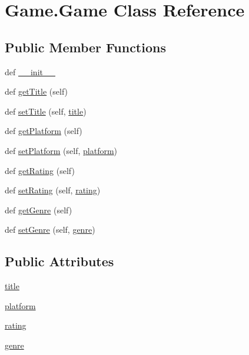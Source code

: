 \hypertarget{class_game_1_1_game}{}\section{Game.\+Game Class Reference}
\label{class_game_1_1_game}
\subsection*{Public Member Functions}
\begin{DoxyCompactItemize}
\item 
def \hyperlink{class_game_1_1_game_a527f0ebbb5bce3e8cdfc3d4ff8a983a5}{\+\_\+\+\_\+init\+\_\+\+\_\+}
\item 
def \hyperlink{class_game_1_1_game_a8df95bdf87496f6ffdee1362b5c368f1}{get\+Title} (self)
\item 
def \hyperlink{class_game_1_1_game_a5c76d56082ee99757bfb8afbd596c611}{set\+Title} (self, \hyperlink{class_game_1_1_game_aa5495f06f46f1871c8736bca793ebcbc}{title})
\item 
def \hyperlink{class_game_1_1_game_aadaee85d41d7b52b519640d96404eb8f}{get\+Platform} (self)
\item 
def \hyperlink{class_game_1_1_game_a4b42643dee147238e1f1edf49b20cb9f}{set\+Platform} (self, \hyperlink{class_game_1_1_game_aa90b68ce03516874d8636bbf49fdc39e}{platform})
\item 
def \hyperlink{class_game_1_1_game_aa7856b02cfbffe83d5c7e05af9ce95dc}{get\+Rating} (self)
\item 
def \hyperlink{class_game_1_1_game_ae0b53653d5a9d4f0f3d3fd266f1d2d49}{set\+Rating} (self, \hyperlink{class_game_1_1_game_a274df8eb8d5dd182acd07582fe0f1e7e}{rating})
\item 
def \hyperlink{class_game_1_1_game_ae6d65e66c29cc6f633d9caba9dcc2a2c}{get\+Genre} (self)
\item 
def \hyperlink{class_game_1_1_game_a0d430c9fba04a7e02814f2628421013d}{set\+Genre} (self, \hyperlink{class_game_1_1_game_a4ab88fbd19810760dbf5be97432fe20f}{genre})
\end{DoxyCompactItemize}
\subsection*{Public Attributes}
\begin{DoxyCompactItemize}
\item 
\hyperlink{class_game_1_1_game_aa5495f06f46f1871c8736bca793ebcbc}{title}
\item 
\hyperlink{class_game_1_1_game_aa90b68ce03516874d8636bbf49fdc39e}{platform}
\item 
\hyperlink{class_game_1_1_game_a274df8eb8d5dd182acd07582fe0f1e7e}{rating}
\item 
\hyperlink{class_game_1_1_game_a4ab88fbd19810760dbf5be97432fe20f}{genre}
\end{DoxyCompactItemize}


